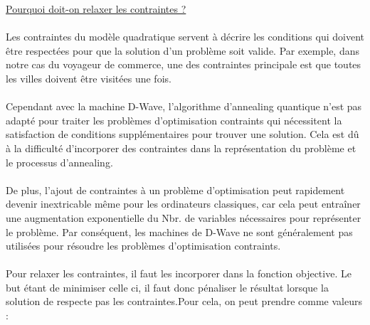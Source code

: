 \documentclass{article}
\begin{document}
        \underline {Pourquoi doit-on relaxer les contraintes ?}\\\\
        Les contraintes du  modèle quadratique servent à décrire les conditions qui doivent être respectées pour que la solution d'un problème soit valide. Par exemple, dans notre cas du voyageur de commerce, une des contraintes principale est que toutes les villes doivent être visitées une fois.\\\\
        Cependant avec la machine D-Wave, l'algorithme d'annealing quantique n'est pas adapté pour traiter les problèmes d'optimisation contraints qui nécessitent la satisfaction de conditions supplémentaires pour trouver une solution. Cela est dû à la difficulté d'incorporer des contraintes dans la représentation du problème et le processus d'annealing.\\\\
        De plus, l'ajout de contraintes à un problème d'optimisation peut rapidement devenir inextricable même pour les ordinateurs classiques, car cela peut entraîner une augmentation exponentielle du Nbr. de variables nécessaires pour représenter le problème. Par conséquent, les machines de D-Wave ne sont généralement pas utilisées pour résoudre les problèmes d'optimisation contraints.\\\\

        Pour relaxer les contraintes, il faut les incorporer dans la fonction objective. Le but étant de minimiser celle ci, il faut donc pénaliser le résultat lorsque la solution de respecte pas les contraintes.Pour cela, on peut prendre comme valeurs :
\end{document}
